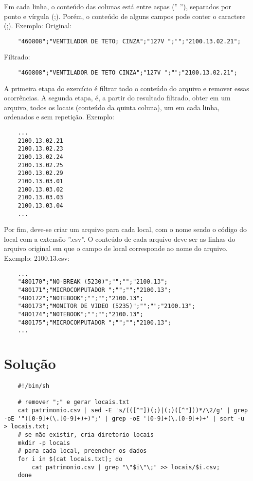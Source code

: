 \documentclass[oneside, 11 pt]{article}
\begin{document}
	Em cada linha, o conteúdo das colunas está entre aspas ('' ''), separados por ponto e vírgula (;). Porém, o conteúdo de alguns campos pode conter o caractere (;). Exemplo:
	Original:
	\begin{lstlisting}
	"460808";"VENTILADOR DE TETO; CINZA";"127V ";"";"2100.13.02.21";
	\end{lstlisting}
	Filtrado:
	\begin{lstlisting}
	"460808";"VENTILADOR DE TETO CINZA";"127V ";"";"2100.13.02.21";
	\end{lstlisting}
	A primeira etapa do exercício é filtrar todo o conteúdo do arquivo e remover essas ocorrências. A segunda etapa, é, a partir do resultado filtrado, obter em um arquivo, todos os locais (conteúdo da quinta coluna), um em cada linha, ordenados e sem repetição.
	Exemplo:
	\begin{lstlisting}
	...
	2100.13.02.21
	2100.13.02.23
	2100.13.02.24
	2100.13.02.25
	2100.13.02.29
	2100.13.03.01
	2100.13.03.02
	2100.13.03.03
	2100.13.03.04
	...
	\end{lstlisting}
	Por fim, deve-se criar um arquivo para cada local, com o nome sendo o código do local com a extensão ''.csv''. O conteúdo de cada arquivo deve ser as linhas do arquivo original em que o campo de local corresponde ao nome do arquivo. Exemplo:
	2100.13.csv:
	\begin{lstlisting}
	...
	"480170";"NO-BREAK (5230)";"";"";"2100.13";
	"480171";"MICROCOMPUTADOR ";"";"";"2100.13";
	"480172";"NOTEBOOK";"";"";"2100.13";
	"480173";"MONITOR DE VIDEO (5235)";"";"";"2100.13";
	"480174";"NOTEBOOK";"";"";"2100.13";
	"480175";"MICROCOMPUTADOR ";"";"";"2100.13";
	...
	\end{lstlisting}
	
	\pagebreak
	
	\section{Solução}
	\begin{lstlisting}
	#!/bin/sh
	
	# remover ";" e gerar locais.txt
	cat patrimonio.csv | sed -E 's/(([^"])(;)|(;)([^"]))*/\2/g' | grep -oE '"([0-9]+(\.[0-9]+)+)";' | grep -oE '[0-9]+(\.[0-9]+)+' | sort -u > locais.txt;
	# se não existir, cria diretorio locais
	mkdir -p locais
	# para cada local, preencher os dados
	for i in $(cat locais.txt); do
		cat patrimonio.csv | grep "\"$i\"\;" >> locais/$i.csv;
	done
	\end{lstlisting}
\end{document}

